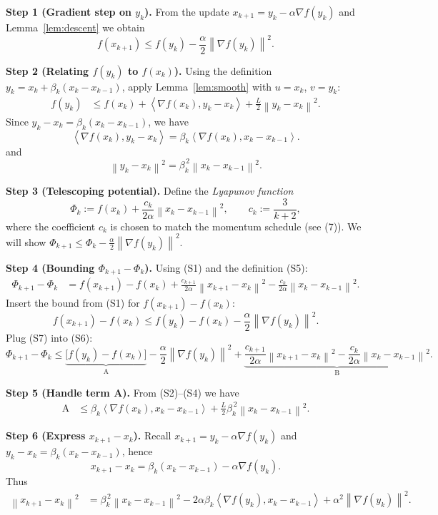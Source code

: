 \documentclass{article}
\newcommand{\norm}[1]{\left\lVert#1\right\rVert}
\newcommand{\inner}[2]{\left\langle #1,#2\right\rangle}
\begin{document}
\medskip
\noindent\textbf{Step 1 (Gradient step on $y_k$).}  
From the update $x_{k+1}=y_k-\alpha\nabla f(y_k)$ and Lemma~\ref{lem:descent} we obtain
\begin{equation}
f(x_{k+1})\le f(y_k)-\frac{\alpha}{2}\norm{\nabla f(y_k)}^2 .
\tag{S1}
\end{equation}

\noindent\textbf{Step 2 (Relating $f(y_k)$ to $f(x_k)$).}  
Using the definition $y_k = x_k + \beta_k (x_k-x_{k-1})$, apply Lemma~\ref{lem:smooth} with $u=x_k$, $v=y_k$:
\[
\begin{aligned}
f(y_k) &\le f(x_k) + \inner{\nabla f(x_k)}{y_k-x_k}
          +\frac{L}{2}\norm{y_k-x_k}^2 .
\end{aligned}
\tag{S2}
\]
Since $y_k-x_k = \beta_k (x_k-x_{k-1})$, we have
\[
\inner{\nabla f(x_k)}{y_k-x_k}
   = \beta_k\inner{\nabla f(x_k)}{x_k-x_{k-1}} .
\tag{S3}
\]
and
\[
\norm{y_k-x_k}^2 = \beta_k^{\,2}\norm{x_k-x_{k-1}}^2 .
\tag{S4}
\]

\noindent\textbf{Step 3 (Telescoping potential).}  
Define the \emph{Lyapunov function}
\[
\Phi_k := f(x_k) + \frac{c_k}{2\alpha}\norm{x_k-x_{k-1}}^2,
\qquad
c_k := \frac{3}{k+2},
\tag{S5}
\]
where the coefficient $c_k$ is chosen to match the momentum schedule (see (7)).  
We will show $\Phi_{k+1}\le \Phi_k-\frac{\alpha}{2}\norm{\nabla f(y_k)}^2$.

\noindent\textbf{Step 4 (Bounding $\Phi_{k+1}-\Phi_k$).}  
Using (S1) and the definition (S5):
\[
\begin{aligned}
\Phi_{k+1}-\Phi_k
&= f(x_{k+1})-f(x_k)
   +\frac{c_{k+1}}{2\alpha}\norm{x_{k+1}-x_k}^2
   -\frac{c_k}{2\alpha}\norm{x_k-x_{k-1}}^2 .
\end{aligned}
\tag{S6}
\]
Insert the bound from (S1) for $f(x_{k+1})-f(x_k)$:
\[
f(x_{k+1})-f(x_k) \le f(y_k)-f(x_k)-\frac{\alpha}{2}\norm{\nabla f(y_k)}^2 .
\tag{S7}
\]
Plug (S7) into (S6):
\[
\Phi_{k+1}-\Phi_k \le
\underbrace{\bigl[f(y_k)-f(x_k)\bigr]}_{\text{A}}
-\frac{\alpha}{2}\norm{\nabla f(y_k)}^2
+\underbrace{\frac{c_{k+1}}{2\alpha}\norm{x_{k+1}-x_k}^2
           -\frac{c_k}{2\alpha}\norm{x_k-x_{k-1}}^2}_{\text{B}} .
\tag{S8}
\]

\noindent\textbf{Step 5 (Handle term A).}  
From (S2)–(S4) we have
\[
\begin{aligned}
\text{A}
&\le \beta_k\inner{\nabla f(x_k)}{x_k-x_{k-1}}
   +\frac{L}{2}\beta_k^{\,2}\norm{x_k-x_{k-1}}^2 .
\end{aligned}
\tag{S9}
\]

\noindent\textbf{Step 6 (Express $x_{k+1}-x_k$).}  
Recall $x_{k+1}=y_k-\alpha\nabla f(y_k)$ and $y_k-x_k=\beta_k(x_k-x_{k-1})$,
hence
\[
x_{k+1}-x_k = \beta_k(x_k-x_{k-1}) - \alpha\nabla f(y_k).
\tag{S10}
\]
Thus
\[
\begin{aligned}
\norm{x_{k+1}-x_k}^2
&= \beta_k^{\,2}\norm{x_k-x_{k-1}}^2
   -2\alpha\beta_k\inner{\nabla f(y_k)}{x_k-x_{k-1}}
   +\alpha^2\norm{\nabla f(y_k)}^2 .
\end{aligned}
\tag{S11}
\]
\end{document}
